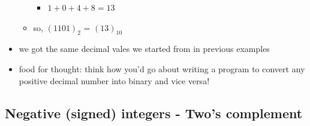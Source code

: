 \documentclass[11pt]{article}
\providecommand{\tightlist}{%
      \setlength{\itemsep}{0pt}\setlength{\parskip}{0pt}}
\begin{document}
\begin{itemize}
\begin{itemize}
    \begin{itemize}
    \tightlist
    \item
      \(1+0+4+8 = 13\)
    \end{itemize}
  \item
    so, \((1101)_2\) = \((13)_{10}\)
  \end{itemize}
\item
  we got the same decimal vales we started from in previous examples
\item
  food for thought: think how you'd go about writing a program to
  convert any positive decimal number into binary and vice versa!
\end{itemize}

    \hypertarget{negative-signed-integers---twos-complement}{%
\subsection{Negative (signed) integers - Two's
complement}\label{negative-signed-integers---twos-complement}}
\end{document}
